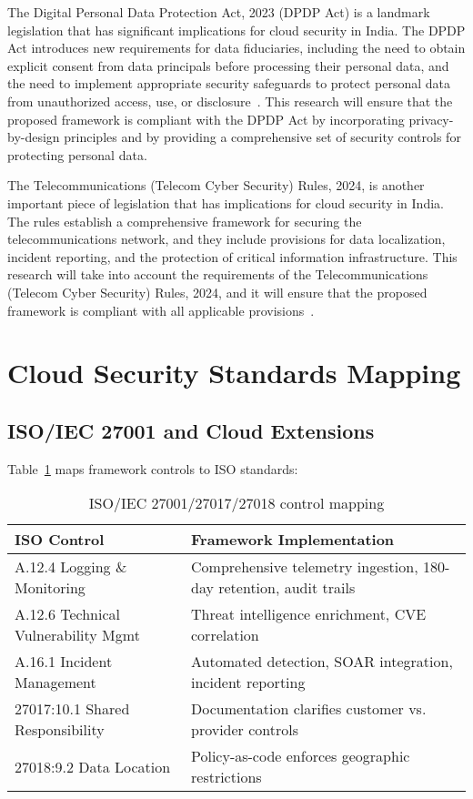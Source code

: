 The Digital Personal Data Protection Act, 2023 (DPDP Act) is a landmark legislation that has significant implications for cloud security in India. The DPDP Act introduces new requirements for data fiduciaries, including the need to obtain explicit consent from data principals before processing their personal data, and the need to implement appropriate security safeguards to protect personal data from unauthorized access, use, or disclosure~\cite{deepit2024dpdp}. This research will ensure that the proposed framework is compliant with the DPDP Act by incorporating privacy-by-design principles and by providing a comprehensive set of security controls for protecting personal data.

The Telecommunications (Telecom Cyber Security) Rules, 2024, is another important piece of legislation that has implications for cloud security in India. The rules establish a comprehensive framework for securing the telecommunications network, and they include provisions for data localization, incident reporting, and the protection of critical information infrastructure. This research will take into account the requirements of the Telecommunications (Telecom Cyber Security) Rules, 2024, and it will ensure that the proposed framework is compliant with all applicable provisions~\cite{cyberlawconsulting2024telecom}.

\section{Cloud Security Standards Mapping}\label{sec:policy-cloud}
\subsection{ISO/IEC 27001 and Cloud Extensions}
Table~\ref{tab:iso-mapping} maps framework controls to ISO standards:

\begin{table}[H]
\centering
\caption{ISO/IEC 27001/27017/27018 control mapping}
\label{tab:iso-mapping}
\begin{tabular}{p{}p{}}
\toprule
\textbf{ISO Control} & \textbf{Framework Implementation} \\
\midrule
A.12.4 Logging \& Monitoring & Comprehensive telemetry ingestion, 180-day retention, audit trails \\
A.12.6 Technical Vulnerability Mgmt & Threat intelligence enrichment, CVE correlation \\
A.16.1 Incident Management & Automated detection, SOAR integration, incident reporting \\
27017:10.1 Shared Responsibility & Documentation clarifies customer vs. provider controls \\
27018:9.2 Data Location & Policy-as-code enforces geographic restrictions \\
\bottomrule
\end{tabular}
\end{table}

